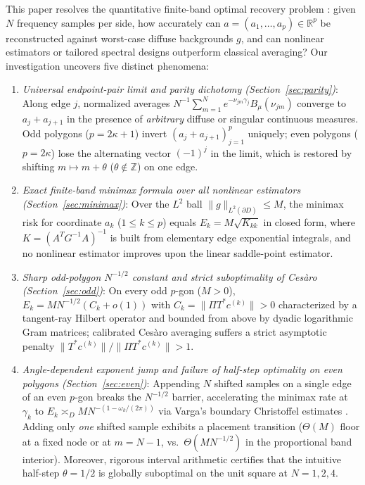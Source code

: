 \documentclass[11pt,reqno]{amsart}
\theoremstyle{definition}
\theoremstyle{remark}
\newcommand{\R}{\mathbb{R}}
\newcommand{\Z}{\mathbb{Z}}
\begin{document}
This paper resolves the quantitative finite-band optimal recovery problem \cite{MicchelliRivlin1977,Donoho1994,DFPW2019}: given $N$ frequency samples per side, how accurately can $a = (a_1,\dots,a_p) \in \R^p$ be reconstructed against worst-case diffuse backgrounds $g$, and can nonlinear estimators or tailored spectral designs outperform classical averaging? Our investigation uncovers five distinct phenomena:
\begin{enumerate}
  \item \emph{Universal endpoint-pair limit and parity dichotomy (Section~\ref{sec:parity})}: Along edge $j$, normalized averages $N^{-1}\sum_{m=1}^N e^{-\nu_{jm}\gamma_j}B_\mu(\nu_{jm})$ converge to $a_j + a_{j+1}$ in the presence of \emph{arbitrary} diffuse or singular continuous measures. Odd polygons ($p = 2\kappa+1$) invert $(a_j + a_{j+1})_{j=1}^p$ uniquely; even polygons ($p = 2\kappa$) lose the alternating vector $(-1)^j$ in the limit, which is restored by shifting $m \mapsto m + \theta$ ($\theta \notin \Z$) on one edge.
  \item \emph{Exact finite-band minimax formula over all nonlinear estimators (Section~\ref{sec:minimax})}: Over the $L^2$ ball $\|g\|_{L^2(\partial D)} \le M$, the minimax risk for coordinate $a_k$ ($1 \le k \le p$) equals $E_k = M\sqrt{K_{kk}}$ in closed form, where $K = (A^T G^{-1} A)^{-1}$ is built from elementary edge exponential integrals, and no nonlinear estimator improves upon the linear saddle-point estimator.
  \item \emph{Sharp odd-polygon $N^{-1/2}$ constant and strict suboptimality of Ces\`aro (Section~\ref{sec:odd})}: On every odd $p$-gon ($M > 0$), $E_k = M N^{-1/2}(C_k + o(1))$ with $C_k = \|\Pi T^* c^{(k)}\| > 0$ characterized by a tangent-ray Hilbert operator and bounded from above by dyadic logarithmic Gram matrices; calibrated Ces\`aro averaging suffers a strict asymptotic penalty $\|T^* c^{(k)}\| / \|\Pi T^* c^{(k)}\| > 1$.
  \item \emph{Angle-dependent exponent jump and failure of half-step optimality on even polygons (Section~\ref{sec:even})}: Appending $N$ shifted samples on a single edge of an even $p$-gon breaks the $N^{-1/2}$ barrier, accelerating the minimax rate at $\gamma_k$ to $E_k \asymp_D M N^{-(1 - \omega_k/(2\pi))}$ via Varga's boundary Christoffel estimates \cite{Varga2013}. Adding only \emph{one} shifted sample exhibits a placement transition ($\Theta(M)$ floor at a fixed node or at $m = N-1$, vs.\ $\Theta(M N^{-1/2})$ in the proportional band interior). Moreover, rigorous interval arithmetic certifies that the intuitive half-step $\theta = 1/2$ is globally suboptimal on the unit square at $N = 1, 2, 4$.

\end{enumerate}
\end{document}
